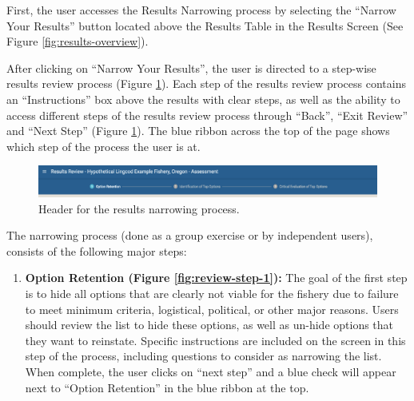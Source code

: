 \documentclass[
  11pt,
]{book}
\providecommand{\tightlist}{%
  \setlength{\itemsep}{0pt}\setlength{\parskip}{0pt}}
\begin{document}
First, the user accesses the Results Narrowing process by selecting the ``Narrow Your Results'' button located above the Results Table in the Results Screen (See Figure \ref{fig:results-overview}).

After clicking on ``Narrow Your Results'', the user is directed to a step-wise results review process (Figure \ref{fig:results-review-header}). Each step of the results review process contains an ``Instructions'' box above the results with clear steps, as well as the ability to access different steps of the results review process through ``Back'', ``Exit Review'' and ``Next Step'' (Figure \ref{fig:results-review-header}). The blue ribbon across the top of the page shows which step of the process the user is at.

\begin{figure}

{\centering \includegraphics[width=0.95\linewidth]{images/results-review-header} 

}

\caption{Header for the results narrowing process.}\label{fig:results-review-header}
\end{figure}

The narrowing process (done as a group exercise or by independent users), consists of the following major steps:

\begin{enumerate}
\def\labelenumi{\arabic{enumi}.}
\tightlist
\item
  \textbf{Option Retention (Figure \ref{fig:review-step-1}):} The goal of the first step is to hide all options that are clearly not viable for the fishery due to failure to meet minimum criteria, logistical, political, or other major reasons. Users should review the list to hide these options, as well as un-hide options that they want to reinstate. Specific instructions are included on the screen in this step of the process, including questions to consider as narrowing the list. When complete, the user clicks on ``next step'' and a blue check will appear next to ``Option Retention'' in the blue ribbon at the top.
\end{enumerate}
\end{document}
